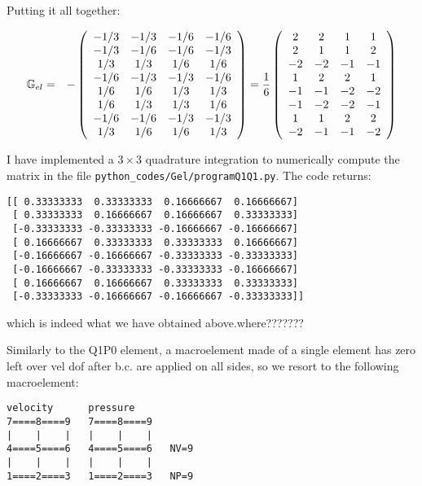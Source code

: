 Putting it all together:

\begin{eqnarray}
{\mathbb{G}}_{el} 
&=&
-
\left(
\begin{array}{cccc}
-1/3 & -1/3  & -1/6 &  -1/6  \\
-1/3 & -1/6  & -1/6 &  -1/3  \\
1/3  & 1/3   & 1/6  &   1/6 \\
-1/6 & -1/3  & -1/3 &  -1/6  \\
1/6 & 1/6    & 1/3  &   1/3 \\
1/6 & 1/3    & 1/3  &   1/6 \\
-1/6 & -1/6   & -1/3 &  -1/3  \\
1/3 & 1/6    & 1/6  &   1/3 \\
\end{array}
\right)
=
\frac{1}{6}
\left(
\begin{array}{cccc}
 2&  2&  1&  1\\
 2&  1&  1&  2\\
-2& -2& -1& -1\\
 1&  2&  2&  1\\
-1& -1& -2& -2\\
-1& -2& -2& -1\\
 1&  1&  2&  2\\
-2& -1& -1& -2
\end{array}
\right)
\end{eqnarray}

I have implemented a $3\times 3$ quadrature integration to numerically compute the matrix in the 
file {\tt python\_codes/Gel/programQ1Q1.py}. The code returns:
\begin{verbatim}
[[ 0.33333333  0.33333333  0.16666667  0.16666667]
 [ 0.33333333  0.16666667  0.16666667  0.33333333]
 [-0.33333333 -0.33333333 -0.16666667 -0.16666667]
 [ 0.16666667  0.33333333  0.33333333  0.16666667]
 [-0.16666667 -0.16666667 -0.33333333 -0.33333333]
 [-0.16666667 -0.33333333 -0.33333333 -0.16666667]
 [ 0.16666667  0.16666667  0.33333333  0.33333333]
 [-0.33333333 -0.16666667 -0.16666667 -0.33333333]]
\end{verbatim}
which is indeed what we have obtained above.where???????

Similarly to the Q1P0 element, a macroelement made of a single element has
zero left over vel dof after b.c. are applied on all sides, so we
resort to the following macroelement:

\begin{verbatim}
velocity      pressure
7====8====9   7====8====9
|    |    |   |    |    |
4====5====6   4====5====6   NV=9
|    |    |   |    |    |   
1====2====3   1====2====3   NP=9
\end{verbatim}

